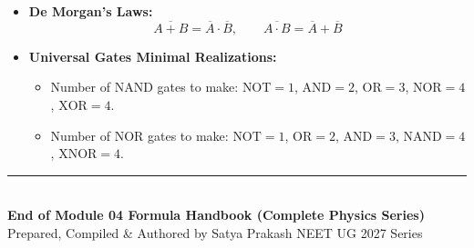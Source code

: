 \documentclass[11pt,a4paper]{article}
\begin{document}
\begin{usecasebox}
\begin{itemize}
  \item \textbf{De Morgan's Laws:}
  \begin{equation*}
    \overline{A + B} = \overline{A}\cdot\overline{B}, \qquad \overline{A\cdot B} = \overline{A} + \overline{B}
  \end{equation*}
  \item \textbf{Universal Gates Minimal Realizations:}
  \begin{itemize}
    \item Number of NAND gates to make: $\text{NOT} = 1$, $\text{AND} = 2$, $\text{OR} = 3$, $\text{NOR} = 4$, $\text{XOR} = 4$.
    \item Number of NOR gates to make: $\text{NOT} = 1$, $\text{OR} = 2$, $\text{AND} = 3$, $\text{NAND} = 4$, $\text{XNOR} = 4$.
  \end{itemize}
\end{itemize}
\end{usecasebox}

\vspace{15pt}
\begin{center}
  \rule{0.6\textwidth}{0.8pt}\\[6pt]
  {\small\textbf{\color{primarydark}End of Module 04 Formula Handbook (Complete Physics Series)}}\\[2pt]
  {\footnotesize\color{accentblue}Prepared, Compiled \& Authored by Satya Prakash \quad\textbar\quad NEET UG 2027 Series}
\end{center}
\end{document}
